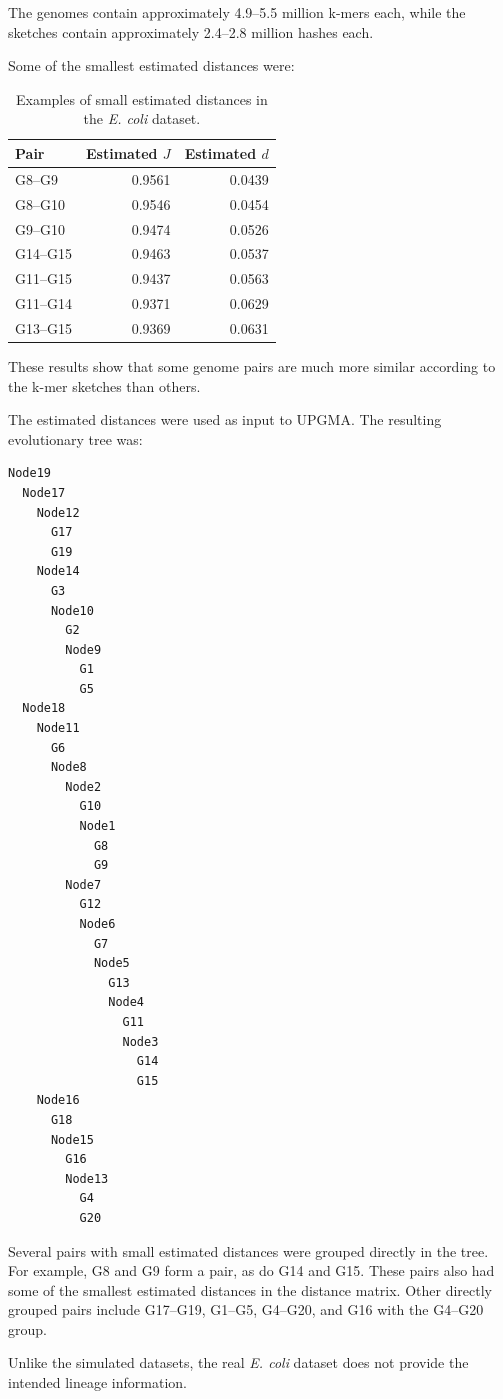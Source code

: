 \documentclass[11pt,a4paper]{article}
\begin{document}
The genomes contain approximately 4.9--5.5 million k-mers each, while the
sketches contain approximately 2.4--2.8 million hashes each.

Some of the smallest estimated distances were:

\begin{table}[H]
\centering
\caption{Examples of small estimated distances in the \textit{E. coli}
dataset.}
\begin{tabular}{lrr}
\toprule
Pair & Estimated $J$ & Estimated $d$\\
\midrule
G8--G9   & 0.9561 & 0.0439\\
G8--G10  & 0.9546 & 0.0454\\
G9--G10  & 0.9474 & 0.0526\\
G14--G15 & 0.9463 & 0.0537\\
G11--G15 & 0.9437 & 0.0563\\
G11--G14 & 0.9371 & 0.0629\\
G13--G15 & 0.9369 & 0.0631\\
\bottomrule
\end{tabular}
\end{table}

These results show that some genome pairs are much more similar according to
the k-mer sketches than others.

The estimated distances were used as input to UPGMA. The resulting
evolutionary tree was:

\newpage
\begin{lstlisting}
Node19
  Node17
    Node12
      G17
      G19
    Node14
      G3
      Node10
        G2
        Node9
          G1
          G5
  Node18
    Node11
      G6
      Node8
        Node2
          G10
          Node1
            G8
            G9
        Node7
          G12
          Node6
            G7
            Node5
              G13
              Node4
                G11
                Node3
                  G14
                  G15
    Node16
      G18
      Node15
        G16
        Node13
          G4
          G20
\end{lstlisting}

Several pairs with small estimated distances were grouped directly in
the tree. For example, G8 and G9 form a pair, as do G14 and G15. These
pairs also had some of the smallest estimated distances in the distance matrix. Other directly grouped pairs include G17--G19, G1--G5, G4--G20, and G16 with the G4--G20 group.

Unlike the simulated datasets, the real \textit{E. coli} dataset does
not provide the intended lineage information. 
\end{document}
